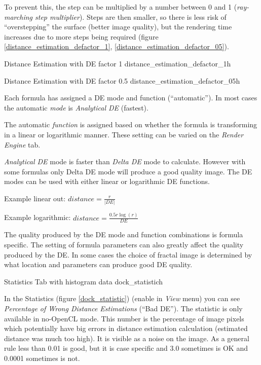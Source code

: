 To prevent this, the step can be multiplied by a number between 0 and 1 (\emph{ray-marching step multiplier}). Steps are then smaller, so there is less risk of ``overstepping'' the surface (better image quality), but the rendering time increases due to more steps being required (figure \ref{distance_estimation_defactor_1}, \ref{distance_estimation_defactor_05}).

{Distance Estimation with DE factor 1}
{distance_estimation_defactor_1}{h}

{Distance Estimation with DE factor 0.5}
{distance_estimation_defactor_05}{h}

Each formula has assigned a DE mode and function (``automatic''). In most cases
the automatic \emph{mode} is \emph{Analytical DE} (fastest).

The automatic \emph{function} is assigned based on whether the formula is
transforming in a linear or logarithmic manner. These setting can be varied on
the \emph{Render Engine} tab.

\emph{Analytical DE} mode is faster than \emph{Delta DE} mode to calculate.
However with some formulas only Delta DE mode will produce a good quality image.
The DE modes can be used with either linear or logarithmic DE functions.

Example linear out: $ distance = \frac{r}{\lvert DE \rvert} $

Example logarithmic: $ distance = \frac{0.5 r  \log(r)}{DE} $

The quality produced by the DE mode and function combinations is formula
specific. The setting of formula parameters can also greatly affect the quality
produced by the DE. In some cases the choice of fractal image is determined by
what location and parameters can produce good DE quality.

\nopagebreak

{Statistics Tab with histogram data}
{dock_statistic}{h}

In the Statistics (figure \ref{dock_statistic}) (enable in \emph{View} menu) you can see \emph{Percentage of
	Wrong Distance Estimations} (``Bad DE''). The statistic is only available in no-OpenCL mode. This number is the percentage of image
pixels which potentially have big errors in distance estimation calculation
(estimated distance was much too high). It is visible as a noise on the image.
As a general rule less than 0.01 is good, but it is case specific and 3.0
sometimes is OK and 0.0001 sometimes is not.

